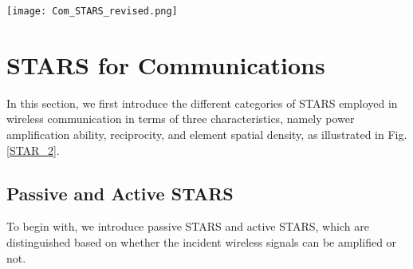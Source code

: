 \documentclass[journal]{IEEEtran}
\theoremstyle{definition}
\begin{document}
\begin{figure*}[t!]
\begin{center}
    \texttt{[image: Com\_STARS\_revised.png]}
    \caption{Different types of STARS employed in wireless communications.}
    \label{STAR_2}
\end{center}
\end{figure*}

\section{STARS for Communications}
In this section, we first introduce the different categories of STARS employed in wireless communication in terms of three characteristics, namely power amplification ability, reciprocity, and element spatial density, as illustrated in Fig. \ref{STAR_2}.

\subsection{Passive and Active STARS}
To begin with, we introduce passive STARS and active STARS, which are distinguished based on whether the incident wireless signals can be amplified or not.
\end{document}
